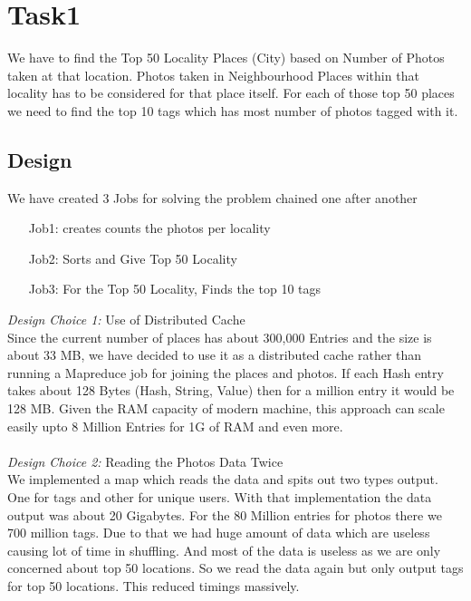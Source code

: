 \chapter{Task1}

	We have to find the Top 50 Locality Places (City) based on Number of Photos taken at that location. Photos taken in Neighbourhood Places within that locality has to be considered for that place itself. For each of those top 50 places we need to find the top 10 tags which has most number of photos tagged with it.
		
\section{Design}
	We have created 3 Jobs for solving the problem chained one after another \\
	\begin{itemize}
		\item [Job1:] creates counts the photos per locality  
		\item [Job2:] Sorts and Give Top 50 Locality 
		\item [Job3:] For the Top 50 Locality, Finds the top 10 tags 
	\end{itemize}

	
	\emph{Design Choice 1:}  Use of Distributed Cache \\
		Since the current number of places has about 300,000 Entries and the size is about 33 MB, we have decided to use it as a distributed cache rather than running a Mapreduce job for joining the places and photos. If each Hash entry takes about 128 Bytes (Hash, String, Value) then for a million entry it would be 128 MB. Given the RAM capacity of modern machine, this approach can scale easily upto 8 Million Entries for 1G of RAM and even more. \\
		\\
	\emph{Design Choice 2:} Reading the Photos Data Twice \\
	 	We implemented a map which reads the data and spits out two types output. One for tags and other for unique users. With that implementation the data output was about 20 Gigabytes. For the 80 Million entries for photos there we 700 million tags. Due to that we had huge amount of data which are useless causing lot of time in shuffling. And most of the data is useless as we are only concerned about top 50 locations. So we read the data again but only output tags for top 50 locations. This reduced timings massively.

